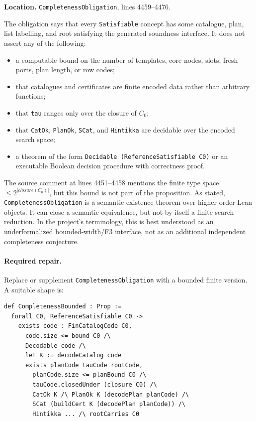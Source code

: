\documentclass[11pt]{article}
\begin{document}
\textbf{Location.} \texttt{CompletenessObligation}, lines 4459--4476.

The obligation says that every \texttt{Satisfiable} concept has some catalogue,
plan, list labelling, and root satisfying the generated soundness interface.
It does not assert any of the following:
\begin{itemize}
  \item a computable bound on the number of templates, core nodes, slots,
        fresh ports, plan length, or row codes;
  \item that catalogues and certificates are finite encoded data rather than
        arbitrary functions;
  \item that \texttt{tau} ranges only over the closure of \(C_0\);
  \item that \texttt{CatOk}, \texttt{PlanOk}, \texttt{SCat}, and
        \texttt{Hintikka} are decidable over the encoded search space;
  \item a theorem of the form \texttt{Decidable (ReferenceSatisfiable C0)} or
        an executable Boolean decision procedure with correctness proof.
\end{itemize}

The source comment at lines 4451--4458 mentions the finite type space
\(\leq 2^{|closure(C_0)|}\), but this bound is not part of the proposition.
As stated, \texttt{CompletenessObligation} is a semantic existence theorem over
higher-order Lean objects.  It can close a semantic equivalence, but not by
itself a finite search reduction.  In the project's terminology, this is best
understood as an underformalized bounded-width/F3 interface, not as an
additional independent completeness conjecture.

\paragraph{Required repair.}
Replace or supplement \texttt{CompletenessObligation} with a bounded finite
version.  A suitable shape is:

\begin{lstlisting}
def CompletenessBounded : Prop :=
  forall C0, ReferenceSatisfiable C0 ->
    exists code : FinCatalogCode C0,
      code.size <= bound C0 /\
      Decodable code /\
      let K := decodeCatalog code
      exists planCode tauCode rootCode,
        planCode.size <= planBound C0 /\
        tauCode.closedUnder (closure C0) /\
        CatOk K /\ PlanOk K (decodePlan planCode) /\
        SCat (buildCert K (decodePlan planCode)) /\
        Hintikka ... /\ rootCarries C0
\end{lstlisting}
\end{document}
